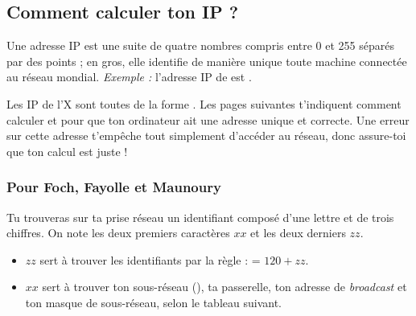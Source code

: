 \subsection{Comment calculer ton IP ?}

\label{calcul_ip}

Une adresse IP est une suite de quatre nombres compris entre 0 et
255 s\'epar\'es par des points ; en gros, elle identifie de mani\`ere
unique toute machine connect\'ee au r\'eseau mondial. \emph{Exemple :}
l'adresse IP de  est .

Les IP de l'X sont toutes de la forme .
Les pages suivantes t'indiquent comment calculer  et  pour que ton
ordinateur ait une adresse unique et correcte. Une erreur sur cette adresse t'emp\^eche tout simplement d'acc\'eder au r\'eseau, donc assure-toi que ton calcul est juste !
\subsubsection{Pour Foch, Fayolle et Maunoury}
Tu trouveras sur ta prise r\'eseau un identifiant compos\'e d'une lettre et de trois chiffres.
On note les deux premiers caract\`eres $xx$ et les deux derniers $zz$.
\begin{itemize}
\item $zz$ sert \`a trouver les identifiants  par la r\`egle :  = $120 + zz$.

\item $xx$ sert \`a trouver ton sous-r\'eseau (), ta passerelle,
ton adresse de \emph{broadcast} et ton masque de sous-r\'eseau, selon le tableau suivant.
\end{itemize}

